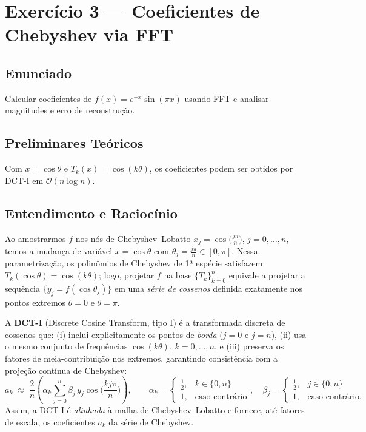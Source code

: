 \documentclass[11pt,a4paper]{article}
\begin{document}
\section{Exercício 3 --- Coeficientes de Chebyshev via FFT}

\subsection*{Enunciado}
Calcular coeficientes de $f(x)=e^{-x}\sin(\pi x)$ usando FFT e analisar magnitudes e erro de reconstrução.

\subsection*{Preliminares Teóricos}
Com $x=\cos\theta$ e $T_k(x)=\cos(k\theta)$, os coeficientes podem ser obtidos por DCT-I em $\mathcal{O}(n\log n)$.



\subsection*{Entendimento e Raciocínio}
Ao amostrarmos $f$ nos nós de Chebyshev–Lobatto $x_j=\cos\!\big(\tfrac{j\pi}{n}\big)$, $j=0,\dots,n$, temos a mudança de variável
$x=\cos\theta$ com $\theta_j=\tfrac{j\pi}{n}\in[0,\pi]$. Nessa parametrização, os polinômios de Chebyshev de 1ª espécie
satisfazem $T_k(\cos\theta)=\cos(k\theta)$; logo, projetar $f$ na base $\{T_k\}_{k=0}^n$ equivale a projetar a sequência
$\{y_j=f(\cos\theta_j)\}$ em uma \emph{série de cossenos} definida exatamente nos pontos extremos $\theta=0$ e $\theta=\pi$.

A \textbf{DCT-I} (Discrete Cosine Transform, tipo I) é a transformada discreta de cossenos que:
(i) inclui explicitamente os pontos de \emph{borda} ($j=0$ e $j=n$),
(ii) usa o mesmo conjunto de frequências $\cos(k\theta)$, $k=0,\dots,n$, e
(iii) preserva os fatores de meia-contribuição nos extremos, garantindo consistência com a projeção contínua de Chebyshev:
\[
a_k \;\approx\; \frac{2}{n}\!\left(\alpha_k \sum_{j=0}^{n}\beta_j\,y_j\cos\!\Big(\frac{k j \pi}{n}\Big)\right),\qquad
\alpha_k=\begin{cases}\tfrac12,&k\in\{0,n\}\\[2pt]1,&\text{caso contrário}\end{cases},\quad
\beta_j=\begin{cases}\tfrac12,&j\in\{0,n\}\\[2pt]1,&\text{caso contrário.}\end{cases}
\]
Assim, a DCT-I é \emph{alinhada} à malha de Chebyshev–Lobatto e fornece, até fatores de escala, os coeficientes $a_k$ da série de Chebyshev.
\end{document}
